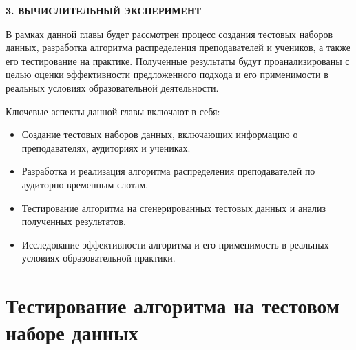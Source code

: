 \newpage
\begin{center}
\textbf{\large 3. ВЫЧИСЛИТЕЛЬНЫЙ ЭКСПЕРИМЕНТ}
\end{center}


В рамках данной главы будет рассмотрен процесс создания тестовых наборов данных, разработка алгоритма распределения преподавателей и учеников, а также его тестирование на практике. Полученные результаты будут проанализированы с целью оценки эффективности предложенного подхода и его применимости в реальных условиях образовательной деятельности.

Ключевые аспекты данной главы включают в себя:
\begin{itemize}
    \item Создание тестовых наборов данных, включающих информацию о преподавателях, аудиториях и учениках.
    \item Разработка и реализация алгоритма распределения преподавателей по аудиторно-временным слотам.
    \item Тестирование алгоритма на сгенерированных тестовых данных и анализ полученных результатов.
    \item Исследование эффективности алгоритма и его применимость в реальных условиях образовательной практики.
\end{itemize}

\section{Тестирование алгоритма на тестовом наборе данных}
\label{MACR-SecIntroduction}
